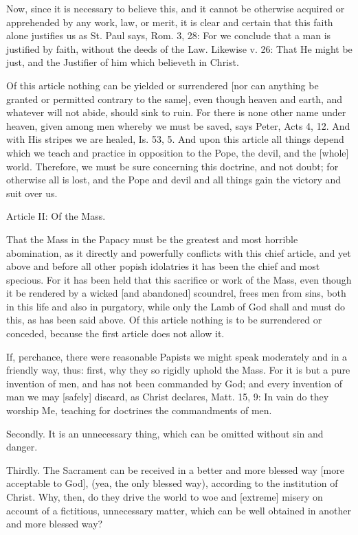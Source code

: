 Now, since it is necessary to believe this, and it cannot be
otherwise acquired or apprehended by any work, law, or merit,
it is clear and certain that this faith alone justifies us as
St. Paul says, Rom. 3, 28: For we conclude that a man is
justified by faith, without the deeds of the Law. Likewise v.
26: That He might be just, and the Justifier of him which
believeth in Christ.

Of this article nothing can be yielded or surrendered [nor can
anything be granted or permitted contrary to the same], even
though heaven and earth, and whatever will not abide, should
sink to ruin. For there is none other name under heaven, given
among men whereby we must be saved, says Peter, Acts 4, 12.
And with His stripes we are healed, Is. 53, 5. And upon this
article all things depend which we teach and practice in
opposition to the Pope, the devil, and the [whole] world.
Therefore, we must be sure concerning this doctrine, and not
doubt; for otherwise all is lost, and the Pope and devil and
all things gain the victory and suit over us.




Article II: Of the Mass.

That the Mass in the Papacy must be the greatest and most
horrible abomination, as it directly and powerfully conflicts
with this chief article, and yet above and before all other
popish idolatries it has been the chief and most specious. For
it has been held that this sacrifice or work of the Mass, even
though it be rendered by a wicked [and abandoned] scoundrel,
frees men from sins, both in this life and also in purgatory,
while only the Lamb of God shall and must do this, as has been
said above. Of this article nothing is to be surrendered or
conceded, because the first article does not allow it.

If, perchance, there were reasonable Papists we might speak
moderately and in a friendly way, thus: first, why they so
rigidly uphold the Mass. For it is but a pure invention of
men, and has not been commanded by God; and every invention of
man we may [safely] discard, as Christ declares, Matt. 15, 9:
In vain do they worship Me, teaching for doctrines the
commandments of men.

Secondly. It is an unnecessary thing, which can be omitted
without sin and danger.

Thirdly. The Sacrament can be received in a better and more
blessed way [more acceptable to God], (yea, the only blessed
way), according to the institution of Christ. Why, then, do
they drive the world to woe and [extreme] misery on account of
a fictitious, unnecessary matter, which can be well obtained
in another and more blessed way?

